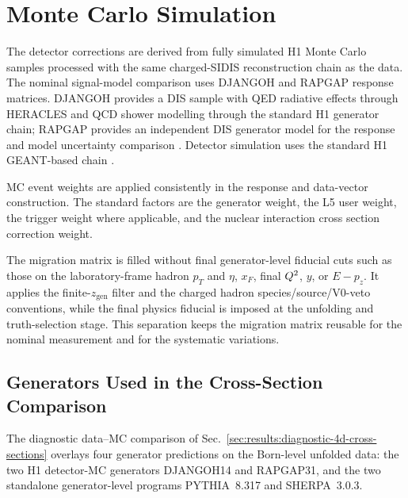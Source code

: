 \section{Monte Carlo Simulation}
\label{sec:monte_carlo}

The detector corrections are derived from fully simulated H1 Monte Carlo
samples processed with the same charged-SIDIS reconstruction chain as the
data.  The nominal signal-model comparison uses DJANGOH and RAPGAP response
matrices.  DJANGOH provides a DIS sample with QED radiative effects through
HERACLES and QCD shower modelling through the standard H1 generator chain;
RAPGAP provides an independent DIS generator model for the response and model
uncertainty comparison \cite{Charchula:1994kf,Kwiatkowski:1990es,Jung:1993gf}.
Detector simulation uses the standard H1 GEANT-based chain \cite{Brun:1987ma}.

MC event weights are applied consistently in the response and data-vector
construction.  The standard factors are the generator weight, the L5 user
weight, the trigger weight where applicable, and the nuclear interaction cross section correction weight.

The migration matrix is filled without final generator-level fiducial cuts such as
those on the laboratory-frame hadron $p_T$ and $\eta$, $x_F$, final $Q^{2}$, $y$, or $E-p_z$.  It applies the finite-$z_{\mathrm{gen}}$ filter and the charged
hadron species/source/V0-veto conventions, while the final physics fiducial is
imposed at the unfolding and truth-selection stage.  This separation keeps the
migration matrix reusable for the nominal measurement and for the systematic variations.

\subsection{Generators Used in the Cross-Section Comparison}
\label{sec:monte_carlo:comparison-generators}

The diagnostic data--MC comparison of
Sec.~\ref{sec:results:diagnostic-4d-cross-sections} overlays four generator
predictions on the Born-level unfolded data: the two H1 detector-MC generators
DJANGOH14 and RAPGAP31, and the two standalone generator-level programs
PYTHIA~8.317 and SHERPA~3.0.3.


